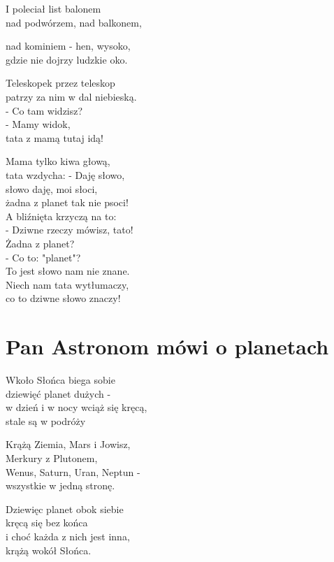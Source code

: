 \documentclass[11pt,a4pape,leqno,twoside]{book}
\begin{document}
I poleciał list balonem\\
nad podwórzem, nad balkonem,\\ \vspace{0.1cm}

nad kominiem - hen, wysoko,\\
gdzie nie dojrzy ludzkie oko.\\ \vspace{0.1cm}

Teleskopek przez teleskop\\
patrzy za nim w dal niebieską.\\
- Co tam widzisz?\\
- Mamy widok,\\
tata z mamą tutaj idą!\\ \vspace{0.1cm}

Mama tylko kiwa głową,\\
tata wzdycha: - Daję słowo,\\
słowo daję, moi słoci,\\
żadna z planet tak nie psoci!\\
A bliźnięta krzyczą na to:\\
- Dziwne rzeczy mówisz, tato!\\
Żadna z planet?\\
- Co to: "planet"?\\
To jest słowo nam nie znane.\\
Niech nam tata wytłumaczy,\\
co to dziwne słowo znaczy!

\chapter{Pan Astronom mówi o planetach}
Wkoło Słońca biega sobie\\
dziewięć planet dużych -\\
w dzień i w nocy wciąż się kręcą,\\
stale są w podróży\\ \vspace{0.1cm}

Krążą Ziemia, Mars i Jowisz,\\
Merkury z Plutonem,\\
Wenus, Saturn, Uran, Neptun -\\
wszystkie w jedną stronę.\\ \vspace{0.1cm}

Dziewięc planet obok siebie\\
kręcą się bez końca\\
i choć każda z nich jest inna,\\
krążą wokół Słońca.\\  \vspace{0.1cm}
\end{document}
